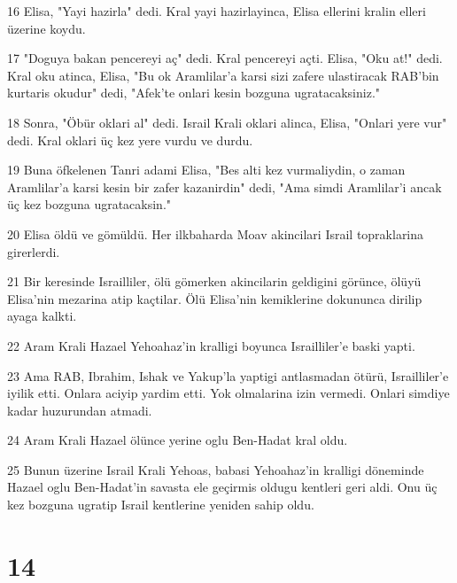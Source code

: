\par 16 Elisa, "Yayi hazirla" dedi. Kral yayi hazirlayinca, Elisa ellerini kralin elleri üzerine koydu.
\par 17 "Doguya bakan pencereyi aç" dedi. Kral pencereyi açti. Elisa, "Oku at!" dedi. Kral oku atinca, Elisa, "Bu ok Aramlilar'a karsi sizi zafere ulastiracak RAB'bin kurtaris okudur" dedi, "Afek'te onlari kesin bozguna ugratacaksiniz."
\par 18 Sonra, "Öbür oklari al" dedi. Israil Krali oklari alinca, Elisa, "Onlari yere vur" dedi. Kral oklari üç kez yere vurdu ve durdu.
\par 19 Buna öfkelenen Tanri adami Elisa, "Bes alti kez vurmaliydin, o zaman Aramlilar'a karsi kesin bir zafer kazanirdin" dedi, "Ama simdi Aramlilar'i ancak üç kez bozguna ugratacaksin."
\par 20 Elisa öldü ve gömüldü. Her ilkbaharda Moav akincilari Israil topraklarina girerlerdi.
\par 21 Bir keresinde Israilliler, ölü gömerken akincilarin geldigini görünce, ölüyü Elisa'nin mezarina atip kaçtilar. Ölü Elisa'nin kemiklerine dokununca dirilip ayaga kalkti.
\par 22 Aram Krali Hazael Yehoahaz'in kralligi boyunca Israilliler'e baski yapti.
\par 23 Ama RAB, Ibrahim, Ishak ve Yakup'la yaptigi antlasmadan ötürü, Israilliler'e iyilik etti. Onlara aciyip yardim etti. Yok olmalarina izin vermedi. Onlari simdiye kadar huzurundan atmadi.
\par 24 Aram Krali Hazael ölünce yerine oglu Ben-Hadat kral oldu.
\par 25 Bunun üzerine Israil Krali Yehoas, babasi Yehoahaz'in kralligi döneminde Hazael oglu Ben-Hadat'in savasta ele geçirmis oldugu kentleri geri aldi. Onu üç kez bozguna ugratip Israil kentlerine yeniden sahip oldu.

\chapter{14}

